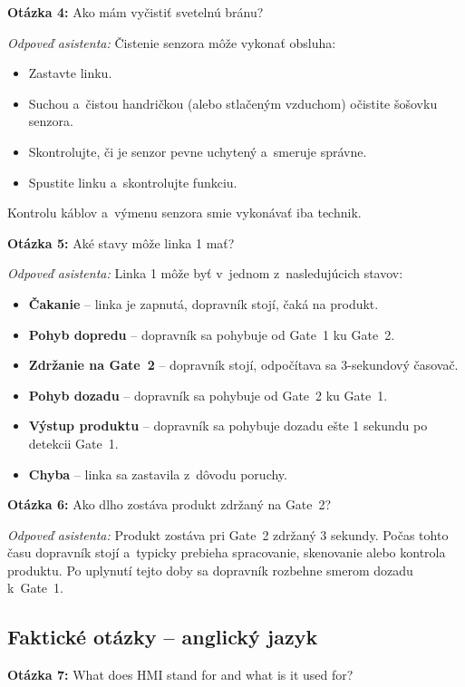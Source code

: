 \bigskip
\noindent\textbf{Otázka 4:} Ako mám vyčistiť svetelnú bránu?

\textit{Odpoveď asistenta:}
Čistenie senzora môže vykonať obsluha:
\begin{itemize}
      \item Zastavte linku.
      \item Suchou a~čistou handričkou (alebo stlačeným vzduchom) očistite
            šošovku senzora.
      \item Skontrolujte, či je senzor pevne uchytený a~smeruje správne.
      \item Spustite linku a~skontrolujte funkciu.
\end{itemize}
Kontrolu káblov a~výmenu senzora smie vykonávať iba technik.

\bigskip
\noindent\textbf{Otázka 5:} Aké stavy môže linka 1 mať?

\textit{Odpoveď asistenta:}
Linka 1 môže byť v~jednom z~nasledujúcich stavov:
\begin{itemize}
      \item \textbf{Čakanie} -- linka je zapnutá, dopravník stojí, čaká na produkt.
      \item \textbf{Pohyb dopredu} -- dopravník sa pohybuje od Gate~1 ku Gate~2.
      \item \textbf{Zdržanie na Gate~2} -- dopravník stojí, odpočítava sa
            3-sekundový časovač.
      \item \textbf{Pohyb dozadu} -- dopravník sa pohybuje od Gate~2 ku Gate~1.
      \item \textbf{Výstup produktu} -- dopravník sa pohybuje dozadu ešte
            1 sekundu po detekcii Gate~1.
      \item \textbf{Chyba} -- linka sa zastavila z~dôvodu poruchy.
\end{itemize}

\bigskip
\noindent\textbf{Otázka 6:} Ako dlho zostáva produkt zdržaný na Gate~2?

\textit{Odpoveď asistenta:}
Produkt zostáva pri Gate~2 zdržaný 3 sekundy. Počas tohto času dopravník
stojí a~typicky prebieha spracovanie, skenovanie alebo kontrola produktu.
Po uplynutí tejto doby sa dopravník rozbehne smerom dozadu k~Gate~1.

\subsection*{Faktické otázky -- anglický jazyk}

\textbf{Otázka 7:} What does HMI stand for and what is it used for?

